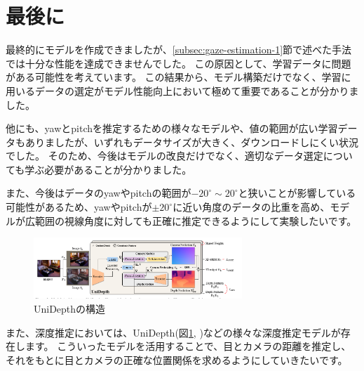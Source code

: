 \section{最後に}
最終的にモデルを作成できましたが、\ref{subsec:gaze-estimation-1}節で述べた手法では十分な性能を達成できませんでした。
この原因として、学習データに問題がある可能性を考えています。
この結果から、モデル構築だけでなく、学習に用いるデータの選定がモデル性能向上において極めて重要であることが分かりました。

他にも、yawとpitchを推定するための様々なモデルや、値の範囲が広い学習データもありましたが、いずれもデータサイズが大きく、ダウンロードしにくい状況でした。
そのため、今後はモデルの改良だけでなく、適切なデータ選定についても学ぶ必要があることが分かりました。

また、今後はデータのyawやpitchの範囲が$-20^\circ \sim 20^\circ$と狭いことが影響している可能性があるため、yawやpitchが$\pm 20^\circ$に近い角度のデータの比重を高め、モデルが広範囲の視線角度に対しても正確に推定できるようにして実験したいです。

\begin{figure}[htbp]
    \centering
    \includegraphics[width=0.7\textwidth]{eye-track-cursor/fig/UniDepth.png}
    \caption{UniDepthの構造 \cite{piccinelli2024unidepthuniversalmonocularmetric}}
    \label{fig:UniDepth}
\end{figure}

また、深度推定においては、UniDepth(図\ref{fig:UniDepth}, \cite{piccinelli2024unidepthuniversalmonocularmetric})などの様々な深度推定モデルが存在します。
こういったモデルを活用することで、目とカメラの距離を推定し、それをもとに目とカメラの正確な位置関係を求めるようにしていきたいです。
